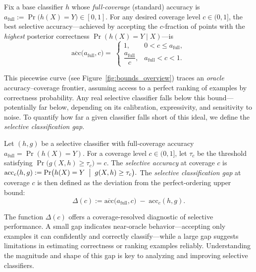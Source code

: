 \begin{definition}
\label{def:poub}
Fix a base classifier \(h\) whose \emph{full‑coverage} (standard) accuracy is
\(a_{\text{full}}:=\Pr\bigl(h(X)=Y\bigr)\in[0,1]\).
For any desired coverage level \(c\in(0,1]\), the best selective
accuracy—achieved by accepting the \(c\)-fraction of points with the \emph{highest}
posterior correctness $\Pr(h(X)=Y\mid X)$—is
\begin{equation}
\label{eq:bound}
\overline{\mathrm{acc}}\bigl(a_{\text{full}},c\bigr)
=\;
\begin{cases}
1, & 0 < c \le a_{\text{full}}, \\[6pt]
\dfrac{a_{\text{full}}}{c}, & a_{\text{full}} < c < 1.
\end{cases}
\end{equation}
\end{definition}

This piecewise curve (see Figure~\ref{fig:bounds_overview}) traces an \emph{oracle} accuracy–coverage frontier, assuming access to a perfect ranking of examples by correctness probability. Any real selective classifier falls below this bound—potentially far below, depending on its calibration, expressivity, and sensitivity to noise. To quantify how far a given classifier falls short of this ideal, we define the \emph{selective classification gap}.

\begin{definition}
\label{def:gap}
Let \((h,g)\) be a selective classifier with full‑coverage accuracy 
\(a_{\mathrm{full}}=\Pr(h(X)=Y)\).  For a coverage level \(c\in(0,1]\), let
\(\tau_c\) be the threshold satisfying \(\Pr\bigl(g(X,h)\ge\tau_c\bigr)=c\).  The \emph{selective accuracy} at coverage \(c\) is
\(
\mathrm{acc}_c(h,g)
:=
\Pr\bigl(h(X)=Y \;\bigm|\; g(X,h)\ge\tau_c\bigr).
\)
The \emph{selective classification gap} at coverage \(c\) is then defined as the deviation from the perfect-ordering upper bound:
\begin{equation}
\Delta(c)
:=
\overline{\mathrm{acc}}\bigl(a_{\mathrm{full}},c\bigr)
\;-\;\mathrm{acc}_c(h,g).
\end{equation}
\end{definition}

The function \(\Delta(c)\) offers a coverage-resolved diagnostic of selective performance. A small gap indicates near-oracle behavior—accepting only examples it can confidently and correctly classify—while a large gap suggests limitations in estimating correctness or ranking examples reliably. Understanding the magnitude and shape of this gap is key to analyzing and improving selective classifiers.

